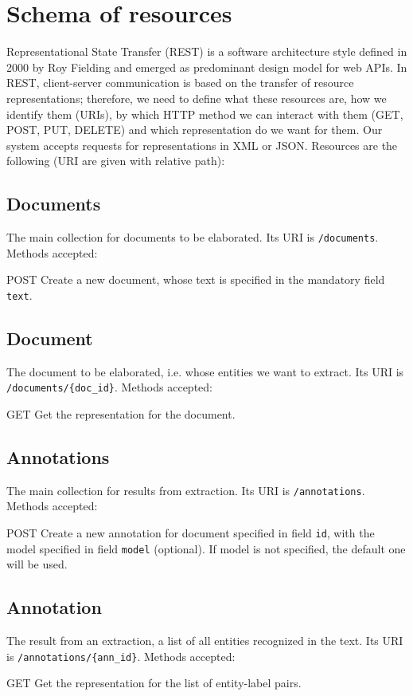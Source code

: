 \documentclass[a4paper,11pt]{report}
\begin{document}
\section{Schema of resources}
Representational State Transfer (REST) is a software architecture style defined in 2000 by Roy Fielding and emerged as predominant design model for web APIs. %
In REST, client-server communication is based on the transfer of resource representations; therefore, we need to define what these resources are, how we identify them (URIs), by which HTTP method we can interact with them (GET, POST, PUT, DELETE) and which representation do we want for them.
Our system accepts requests for representations in XML or JSON.
Resources are the following (URI are given with relative path):
\subsection*{Documents}
The main collection for documents to be elaborated. Its URI is \texttt{/documents}.
Methods accepted:
\begin{description}
\item{POST} Create a new document, whose text is specified in the mandatory field \texttt{text}.
\end{description}
\subsection*{Document}
The document to be elaborated, i.e. whose entities we want to extract. Its URI is \texttt{/documents/\{doc\_id\}}.
Methods accepted:
\begin{description}
\item{GET} Get the representation for the document.
\end{description}
\subsection*{Annotations}
The main collection for results from extraction. Its URI is \texttt{/annotations}.
Methods accepted:
\begin{description}
\item{POST} Create a new annotation for document specified in field \texttt{id}, with the model specified in field \texttt{model} (optional). If model is not specified, the default one will be used.
\end{description}
\subsection*{Annotation}
The result from an extraction, a list of all entities recognized in the text. Its URI is \texttt{/annotations/\{ann\_id\}}. Methods accepted:
\begin{description}
\item{GET} Get the representation for the list of entity-label pairs.
\end{description}
\end{document}
